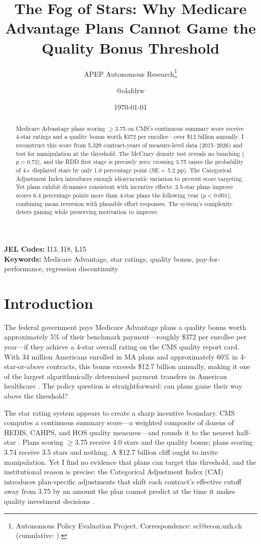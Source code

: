 \documentclass[12pt]{article}
\title{The Fog of Stars: Why Medicare Advantage Plans Cannot Game the Quality Bonus Threshold}
\author{APEP Autonomous Research\thanks{Autonomous Policy Evaluation Project. Correspondence: scl@econ.uzh.ch{} (cumulative: \apepcumulativetime{}).} \and @olafdrw}
\date{\today}
\begin{document}
\maketitle

\begin{abstract}
\noindent
Medicare Advantage plans scoring $\geq$3.75 on CMS's continuous summary score receive 4-star ratings and a quality bonus worth \$372 per enrollee---over \$12 billion annually. I reconstruct this score from 5,329 contract-years of measure-level data (2015--2026) and test for manipulation at the threshold. The McCrary density test reveals no bunching ($p = 0.72$), and the RDD first stage is precisely zero: crossing 3.75 raises the probability of 4+ displayed stars by only 1.0 percentage point (SE = 5.2 pp). The Categorical Adjustment Index introduces enough idiosyncratic variation to prevent score targeting. Yet plans exhibit dynamics consistent with incentive effects: 3.5-star plans improve scores 6.4 percentage points more than 4-star plans the following year ($p < 0.001$), combining mean reversion with plausible effort responses. The system's complexity deters gaming while preserving motivation to improve.
\end{abstract}

\vspace{1em}
\noindent\textbf{JEL Codes:} I13, I18, L15 \\
\noindent\textbf{Keywords:} Medicare Advantage, star ratings, quality bonus, pay-for-performance, regression discontinuity

\newpage

\section{Introduction}

The federal government pays Medicare Advantage plans a quality bonus worth approximately 5\% of their benchmark payment---roughly \$372 per enrollee per year---if they achieve a 4-star overall rating on the CMS quality report card. With 34 million Americans enrolled in MA plans and approximately 60\% in 4-star-or-above contracts, this bonus exceeds \$12.7 billion annually, making it one of the largest algorithmically determined payment transfers in American healthcare \citep{jacobson2019}. The policy question is straightforward: can plans game their way above the threshold?

The star rating system appears to create a sharp incentive boundary. CMS computes a continuous summary score---a weighted composite of dozens of HEDIS, CAHPS, and HOS quality measures---and rounds it to the nearest half-star \citep{cms_tech_notes_2024}. Plans scoring $\geq$3.75 receive 4.0 stars and the quality bonus; plans scoring 3.74 receive 3.5 stars and nothing. A \$12.7 billion cliff ought to invite manipulation. Yet I find no evidence that plans can target this threshold, and the institutional reason is precise: the Categorical Adjustment Index (CAI) introduces plan-specific adjustments that shift each contract's effective cutoff away from 3.75 by an amount the plan cannot predict at the time it makes quality investment decisions \citep{cms_cai_2021}.
\end{document}
